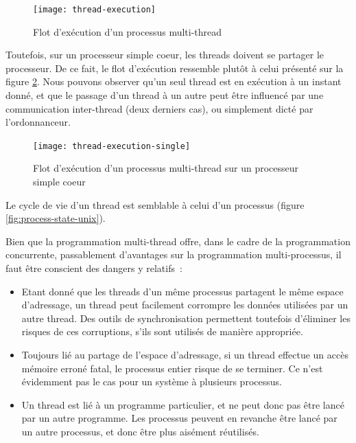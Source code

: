 \begin{figure}[ht]
  \begin{center}
    \texttt{[image: thread-execution]}
    \caption{\label{fig:thread-execution}Flot d'exécution d'un processus multi-thread}
  \end{center}
\end{figure}

Toutefois, sur un processeur simple coeur, les threads doivent se partager le processeur. De ce fait, le flot d'exécution ressemble plutôt à celui présenté sur la figure \ref{fig:thread-execution-single}. Nous pouvons observer qu'un seul thread est en exécution à un instant donné, et que le passage d'un thread à un autre peut être influencé par une communication inter-thread (deux derniers cas), ou simplement dicté par l'ordonnanceur.

\begin{figure}[ht]
  \begin{center}
    \texttt{[image: thread-execution-single]}
    \caption{\label{fig:thread-execution-single}Flot d'exécution d'un processus multi-thread sur un processeur simple coeur}
  \end{center}
\end{figure}

Le cycle de vie d'un thread est semblable à celui d'un processus (figure \ref{fig:process-state-unix}).

Bien que la programmation multi-thread offre, dans le cadre de la programmation concurrente, passablement d'avantages sur la programmation multi-processus, il faut être conscient des dangers y relatifs~:

\begin{itemize}
\item Etant donné que les threads d'un même processus partagent le même espace d'adressage, un thread peut facilement corrompre les données utilisées par un autre thread. Des outils de synchronisation permettent toutefois d'éliminer les risques de ces corruptions, s'ils sont utilisés de manière appropriée.

\item Toujours lié au partage de l'espace d'adressage, si un thread effectue un accès mémoire erroné fatal, le processus entier risque de se terminer. Ce n'est évidemment pas le cas pour un système à plusieurs processus.

\item Un thread est lié à un programme particulier, et ne peut donc pas être lancé par un autre programme. Les processus peuvent en revanche être lancé par un autre processus, et donc être plus aisément réutilisés.
\end{itemize}

